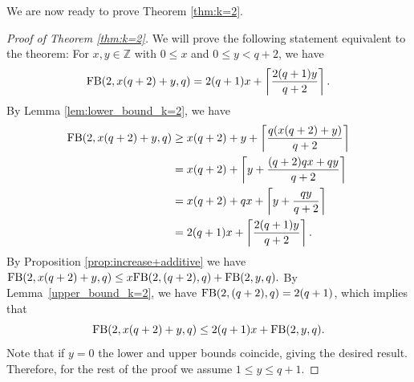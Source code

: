 \documentclass[11pt,a4paper]{article}
\theoremstyle{definition}
\newcommand{\Z}{\mathbb Z}
\newcommand{\fb}{\textnormal{FB}}
\begin{document}
We are now ready to prove Theorem \ref{thm:k=2}.
\begin{proof} [Proof of Theorem \ref{thm:k=2}]
We will prove the following statement equivalent to the theorem:
For $x,y \in \Z$ with $0\le x$ and $0 \le y < q+2$, we have 
$$\fb(2,x(q+2)+y,q) = 2(q+1)x + \left\lceil \frac{2(q+1)y}{q+2} \right\rceil.$$ By Lemma \ref{lem:lower_bound_k=2}, we have 
\begin{align*}
\fb(2,x(q+2)+y,q) &\ge x(q+2) + y + \left\lceil \frac{q(x(q+2)+y)}{q+2} \right\rceil  \\
&= x(q+2) + \left\lceil y+ \frac{(q+2)qx+qy}{q+2} \right\rceil \\
&= x(q+2)+qx + \left\lceil y+ \frac{qy}{q+2} \right\rceil \\
&= 2(q+1)x + \left\lceil \frac{2(q+1)y}{q+2} \right\rceil.
\end{align*}
By Proposition \ref{prop:increase+additive} we have 
$\fb(2,x(q+2)+y,q) \le x \fb(2,(q+2),q) + \fb(2,y,q).$ By Lemma~\ref{upper_bound_k=2}, we have $\fb(2,(q+2),q) = 2(q+1)$, which implies that 
$$\fb(2,x(q+2)+y,q) \le 2(q+1)x + \fb(2,y,q).$$ Note that if $y=0$ the lower and upper bounds coincide, giving the desired result. Therefore, for the rest of the proof we assume $1 \le y \le q+1$. 


\end{proof}
\end{document}
